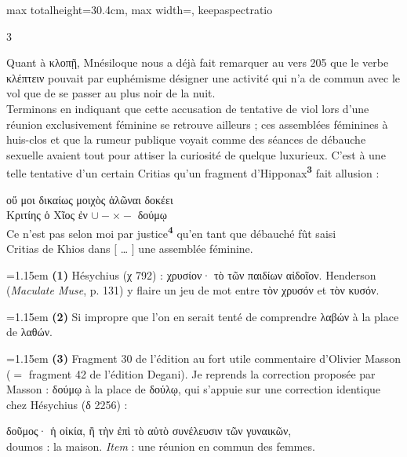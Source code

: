 \documentclass[11pt,twoside]{book}
\newcommand{\italique}[1]{\textit{#1}}
\newcommand{\citComm}[1]{\begin{quoting}[vskip=0.4pt,leftmargin=0.7em,rightmargin=0.2em]#1\end{quoting}}
\newcommand{\marqueur}[1]{\textsuperscript{\color{rubricRed}\textbf{#1}}}
\begin{document}
\begin{adjustbox}{max totalheight=30.4cm, max width=\textwidth, keepaspectratio}
\begin{minipage}{\textwidth}
{\begin{multicols}{3}
\par\vspace{1.5pt}
\noindent Quant à κλοπῇ, Mnésiloque nous a déjà fait remarquer au vers 205 que le verbe κλέπτειν pouvait par euphémisme désigner une activité qui n'a de commun avec le vol que de se passer au plus noir de la nuit.\\ Terminons en indiquant que cette accusation de tentative de viol lors d'une réunion exclusivement féminine se retrouve ailleurs ; ces assemblées féminines à huis-clos et que la rumeur publique voyait comme des séances de débauche sexuelle avaient tout pour attiser la curiosité de quelque luxurieux. C'est à une telle tentative d'un certain Critias qu'un fragment d'Hipponax\marqueur{3} fait allusion :
\citComm{οὔ μοι δικαίως μοιχὸς ἁλῶναι δοκέει\\
Κριτίης ὁ Χῖος ἐν $ \cup - \times - $ δούμῳ\\
Ce n'est pas selon moi par justice\marqueur{4} qu'en tant que débauché fût saisi\\
Critias de Khios dans $[$ … $]$ une assemblée féminine.}
\par\vspace{1.5pt}
\par\vspace{1.2pt}\par\nopagebreak\vspace{1pt}\noindent\hangindent=1.15em {\color{sepiaNote}\textbf{(1)}} Hésychius (χ 792) : χρυσίον· τὸ τῶν παιδίων αἰδοῖον. Henderson (\italique{Maculate Muse}, p. 131) y flaire un jeu de mot entre τὸν χρυσόν et τὸν κυσόν.
\par\vspace{1.5pt}
\noindent\hangindent=1.15em {\color{sepiaNote}\textbf{(2)}} Si impropre que l'on en serait tenté de comprendre λαβών à la place de λαθών.
\par\vspace{1.5pt}
\noindent\hangindent=1.15em {\color{sepiaNote}\textbf{(3)}} Fragment 30 de l'édition au fort utile commentaire d'Olivier Masson ($=$ fragment 42 de l'édition Degani). Je reprends la correction proposée par Masson : δούμῳ à la place de δούλῳ, qui s'appuie sur une correction identique chez Hésychius (δ 2256) :
\citComm{δοῦμος· ἡ οἰκία, ἢ τὴν ἐπὶ τὸ αὐτὸ συνέλευσιν τῶν γυναικῶν,\\
doumos : la maison. \italique{Item} : une réunion en commun des femmes.}
\par\vspace{1.5pt}

\end{multicols}}
\end{minipage}
\end{adjustbox}
\end{document}

